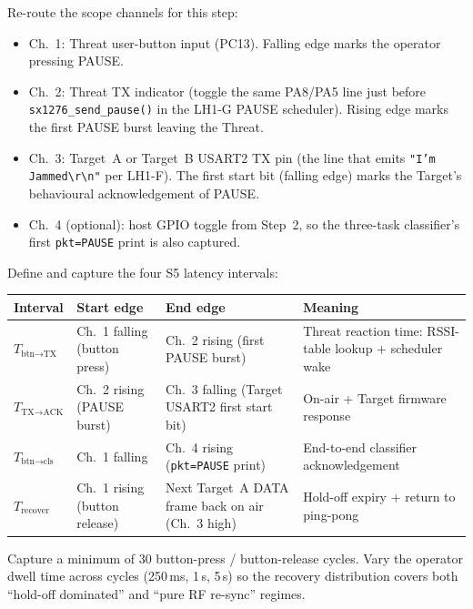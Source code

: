 \documentclass[11pt,letterpaper]{article}
\begin{document}
Re-route the scope channels for this step:
\begin{itemize}[leftmargin=2em]
	\item Ch.~1: Threat user-button input (PC13). Falling edge marks the operator pressing PAUSE.
	\item Ch.~2: Threat \mbox{TX} indicator (toggle the same PA8/PA5 line just before \texttt{sx1276\_send\_pause()} in the LH1-G PAUSE scheduler). Rising edge marks the first PAUSE burst leaving the Threat.
	\item Ch.~3: Target~A or Target~B USART2 \mbox{TX} pin (the line that emits \texttt{"I'm Jammed\textbackslash r\textbackslash n"} per LH1-F). The first start bit (falling edge) marks the Target's behavioural acknowledgement of PAUSE.
	\item Ch.~4 (optional): host \mbox{GPIO} toggle from Step~2, so the three-task classifier's first \texttt{pkt=PAUSE} print is also captured.
\end{itemize}

Define and capture the four S5 latency intervals:

\begin{table}[h!]
	\centering
	\renewcommand{\arraystretch}{1.3}
	\begin{tabularx}{\textwidth}{l l l X}
		\toprule
		\textbf{Interval} & \textbf{Start edge} & \textbf{End edge} & \textbf{Meaning} \\
		\midrule
		$T_{\text{btn}\to\text{TX}}$    & Ch.~1 falling (button press) & Ch.~2 rising (first PAUSE burst) & Threat reaction time: RSSI-table lookup + scheduler wake \\
		$T_{\text{TX}\to\text{ACK}}$    & Ch.~2 rising (PAUSE burst)   & Ch.~3 falling (Target USART2 first start bit) & On-air + Target firmware response \\
		$T_{\text{btn}\to\text{cls}}$   & Ch.~1 falling                & Ch.~4 rising (\texttt{pkt=PAUSE} print) & End-to-end classifier acknowledgement \\
		$T_{\text{recover}}$            & Ch.~1 rising (button release)& Next Target~A DATA frame back on air (Ch.~3 high) & Hold-off expiry + return to ping-pong \\
		\bottomrule
	\end{tabularx}
\end{table}

Capture a minimum of 30 button-press / button-release cycles. Vary the operator dwell time across cycles (250\,ms, 1\,s, 5\,s) so the recovery distribution covers both ``hold-off dominated'' and ``pure RF re-sync'' regimes.
\end{document}
